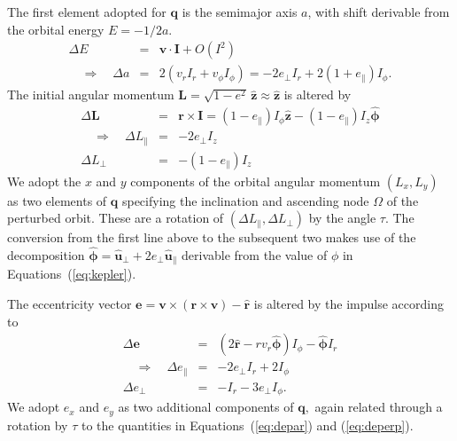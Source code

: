 \documentclass[linenumbers, onecolumn]{aastex631}
\newcommand{\vecI}{\mathbf{I}}
\newcommand{\vece}{\mathbf{e}}
\newcommand{\rhat}{\mathbf{\hat r}}
\newcommand{\phat}{\boldsymbol{\hat\phi}}
\newcommand{\uhat}{\boldsymbol{\hat u}}
\newcommand{\zhat}{\mathbf{\hat z}}
\newcommand{\vecq}{\mathbf{q}}
\newcommand{\vecr}{\mathbf{r}}
\newcommand{\vecv}{\mathbf{v}}
\begin{document}
The first element adopted for $\vecq$ is the semimajor axis $a$, with
shift derivable from the orbital energy $E=-1/2a.$
\begin{eqnarray}
  \Delta E & = &  \vecv \cdot \vecI + O(I^2) \\
  \quad \Rightarrow \quad \Delta a & = & 2\left(v_r I_r + v_\phi I_\phi\right) = -2e_\perp I_r + 2(1+e_\parallel) I_\phi.
  \label{eq:da}
\end{eqnarray}
The initial angular momentum $\mathbf{L} = \sqrt{1-e^2}\,\zhat \approx \zhat$ is altered by
\begin{eqnarray}
  \Delta \mathbf{L} & = & \vecr \times \vecI = (1-e_\parallel) I_\phi \zhat - (1-e_\parallel) I_z \phat \\
  \quad \Rightarrow \quad \Delta L_\parallel & = & -2e_\perp I_z
  \label{eq:dLpar}\\
  \Delta L_\perp & = & -(1-e_\parallel)  I_z
                  \label{eq:dLperp}
\end{eqnarray}
We adopt the $x$ and $y$ components of the orbital angular momentum
$(L_x, L_y)$ as two elements of $\vecq$ specifying the inclination and
ascending node $\Omega$ of the perturbed orbit.  These are a rotation
of $(\Delta L_\parallel, \Delta L_\perp)$ by the angle $\tau.$  The conversion from the first line above to the subsequent two makes use of the decomposition $\phat=\uhat_\perp + 2e_\perp \uhat_\parallel$ derivable from the value of $\phi$ in Equations~(\ref{eq:kepler}).

The eccentricity vector $\vece = \vecv \times (\vecr \times \vecv) - \rhat$ is altered by the impulse according to
\begin{eqnarray}
  \Delta\vece & = & (2\rhat - rv_r \phat) I_\phi - \phat I_r \\
\label{eq:depar}
  \quad \Rightarrow \quad \Delta e_\parallel & = &  -2e_\perp I_r + 2 I_\phi \\
\Delta e_\perp & = & -I_r - 3e_\perp I_\phi.
\label{eq:deperp}
\end{eqnarray}
We adopt $e_x$ and $e_y$ as two additional components of $\vecq,$ again related through a rotation by $\tau$ to the quantities in Equations~(\ref{eq:depar}) and (\ref{eq:deperp}).
\end{document}

